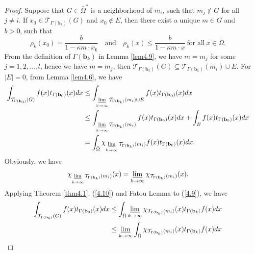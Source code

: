 \documentclass[a4paper,12pt,]{article}
\numberwithin{equation}{section}
\numberwithin{equation}{section} \allowdisplaybreaks
\begin{document}
\begin{proof}
  Suppose that $G \in \bar{\Omega}^{\ast}$ is a neighborhood of $m_{i}$, such that $m_{j} \notin G$ for all $j \neq i$. If $x_{0} \in \mathcal{T}_{\Gamma({\mathbf{b}_{k}})}(G)$ and $x_{0} \notin E$, then there exist a unique $m \in G$ and $b >0$, such that
  $$\rho_{k}(x_{0}) = \frac{b}{1 - \kappa m \cdot x_{0}} \quad \text{and} \quad \rho_{k}(x) \leq \frac{b}{1 - \kappa m \cdot x}~\text{for all}~x \in \bar{\Omega}.$$
  From the definition of $\Gamma(\mathbf{b}_{k})$ in Lemma \ref{lem4.9}, we have $m = m_{j}$ for some $j = 1,2,\ldots,l$, hence we have $m = m_{j}$, then $\mathcal{T}_{\Gamma({\mathbf{b}_{k}})}(G) \subseteq \mathcal{T}_{\Gamma({\mathbf{b}_{k}})}(m_{i}) \cup E$. For $\vert E \vert = 0$, from Lemma \ref{lem4.6}, we have
  \begin{equation}\label{4.9}
    \begin{aligned}
    \int_{\mathcal{T}_{\Gamma({\mathbf{b}_{0}})}(G)}f(x)t_{\Gamma({\mathbf{b}_{0}})}(x)dx & \leq \int_{\varliminf\limits_{k \rightarrow \infty} \mathcal{T}_{\Gamma({\mathbf{b}_{k}})}(m_{i}) \cup E}f(x)t_{\Gamma({\mathbf{b}_{0}})}(x)dx \\
     & \leq \int_{\varliminf\limits_{k \rightarrow \infty} \mathcal{T}_{\Gamma({\mathbf{b}_{k}})}(m_{i})}f(x)t_{\Gamma({\mathbf{b}_{0}})}(x)dx + \int_{E}f(x)t_{\Gamma({\mathbf{b}_{0}})}(x)dx \\
     & = \int_{\bar{\Omega}}\chi_{\varliminf\limits_{k \rightarrow \infty} \mathcal{T}_{\Gamma({\mathbf{b}_{k}})}(m_{i})}f(x)t_{\Gamma({\mathbf{b}_{0}})}(x)dx.
  \end{aligned}
  \end{equation}
  Obviously, we have
  \begin{equation}\label{4.10}
   \chi_{\varliminf\limits_{k \rightarrow \infty} \mathcal{T}_{\Gamma({\mathbf{b}_{k}})}(m_{i})}(x) = \varliminf\limits_{k \rightarrow \infty} \chi_{\mathcal{T}_{\Gamma({\mathbf{b}_{k}})}(m_{i})}(x).
  \end{equation}
  Applying Theorem \ref{thm4.1}, (\ref{4.10}) and Fatou Lemma to (\ref{4.9}), we have
  \begin{equation}\label{4.11}
    \begin{aligned}
    \int_{\mathcal{T}_{\Gamma({\mathbf{b}_{0}})}(G)}f(x)t_{\Gamma({\mathbf{b}_{0}})}(x)dx & \leq \int_{\bar{\Omega}}\varliminf\limits_{k \rightarrow \infty} \chi_{\mathcal{T}_{\Gamma({\mathbf{b}_{k}})}(m_{i})}(x)t_{\Gamma({\mathbf{b}_{k}})}f(x)dx \\
    & \leq \varliminf\limits_{k \rightarrow \infty} \int_{\bar{\Omega}}\chi_{\mathcal{T}_{\Gamma({\mathbf{b}_{k}})}(m_{i})}(x)t_{\Gamma({\mathbf{b}_{k}})}f(x)dx \\

\end{aligned}
\end{equation}
\end{proof}
\end{document}
